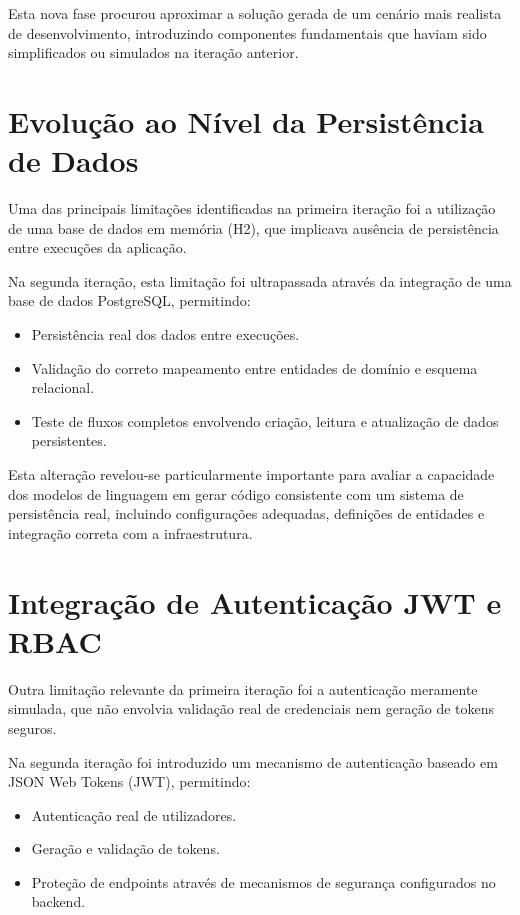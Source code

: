 Esta nova fase procurou aproximar a solução gerada de um cenário mais realista de desenvolvimento, introduzindo componentes fundamentais que haviam sido simplificados ou simulados na iteração anterior.

\section{Evolução ao Nível da Persistência de Dados}

Uma das principais limitações identificadas na primeira iteração foi a utilização de uma base de dados em memória (H2), que implicava ausência de persistência entre execuções da aplicação.

Na segunda iteração, esta limitação foi ultrapassada através da integração de uma base de dados PostgreSQL, permitindo:

\begin{itemize}
  \item Persistência real dos dados entre execuções.
  \item Validação do correto mapeamento entre entidades de domínio e esquema relacional.
  \item Teste de fluxos completos envolvendo criação, leitura e atualização de dados persistentes.
\end{itemize}

Esta alteração revelou-se particularmente importante para avaliar a capacidade dos modelos de linguagem em gerar código consistente com um sistema de persistência real, incluindo configurações adequadas, definições de entidades e integração correta com a infraestrutura.

\section{Integração de Autenticação JWT e RBAC}

Outra limitação relevante da primeira iteração foi a autenticação meramente simulada, que não envolvia validação real de credenciais nem geração de tokens seguros.

Na segunda iteração foi introduzido um mecanismo de autenticação baseado em JSON Web Tokens (JWT), permitindo:

\begin{itemize}
  \item Autenticação real de utilizadores.
  \item Geração e validação de tokens.
  \item Proteção de endpoints através de mecanismos de segurança configurados no backend.
\end{itemize}

